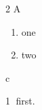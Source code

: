 \documentclass{article}
\begin{document}
\textcircled{\small{2}} \textcircled{\small A}
\begin{enumerate}[label=\protect\textcircled{\normalsize\arabic*}]
\item one
\item two
\end{enumerate}
\textcircled{c}

{\everypar{[EP]}\textcircled{1} first.\par}
\end{document}

